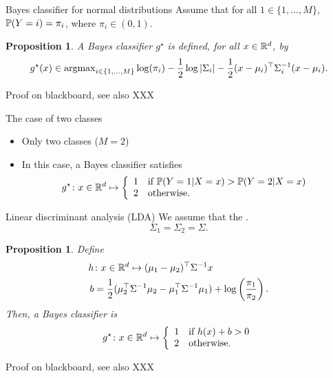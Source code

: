 \documentclass[xcolor={usenames,dvipsnames},handout]{beamer}
\newtheorem{prop}[theorem]{Proposition}
\begin{document}
\begin{frame}{Bayes classifier for normal distributions}
Assume that for all $1\in\{1,\ldots,M\}$, \alert{$\P(Y= i) = \pi_i$, where $\pi_i\in(0,1)$}.

\vspace{.2cm}

	\begin{prop}
		A Bayes classifier $g^\star$ is defined, for all $x \in \R^d$, by
		\pause
		$$
			g^\star(x) \in \argmax_{i \in \{1,\ldots,M\}} \log(\pi_i) - \frac 12 \log |\Sigma_i| - \frac 12 (x-\mu_i)^\top \Sigma_i^{-1} (x-\mu_i).
		$$
	\end{prop}

\vspace{.3cm}

\centering
{\color{Vert} Proof on blackboard, see also XXX}

\end{frame}


\begin{frame}{The case of two classes}
	\begin{itemize}
	\item  Only two classes ($M=2$) 
	\item In this case, a Bayes classifier satisfies
	$$
		g^\star \colon x \in \R^d \mapsto
		\left\{ \begin{array}{ll}
			1 & \text{if }\P (Y=1 | X=x) >\P(Y=2 | X=x) \\
			2 & \text{otherwise}.
		\end{array} \right.
	$$
	\end{itemize}
\end{frame}


\begin{frame}{Linear discriminant analysis (LDA)}
	We assume that the .
	$$
		\Sigma_1 = \Sigma_2 = \Sigma.
	$$

	
	\begin{prop}
		Define 
		\begin{align*}
			h &\colon x \in \R^d \mapsto (\mu_1-\mu_2)^\top\Sigma^{-1}x \\
			b &= \frac 12 (\mu_2^\top\Sigma^{-1}\mu_2 - \mu_1^\top\Sigma^{-1}\mu_1) + \log \left( \frac{\pi_1}{\pi_2} \right).
		\end{align*}
		Then, a Bayes classifier is
		$$
			g^\star \colon x \in \R^d \mapsto
			\left\{ \begin{array}{ll}
				1 & \text{if } h(x) + b > 0 \\
				2 & \text{otherwise}.
			\end{array} \right.
		$$
	\end{prop}

\centering
{\color{Vert} Proof on blackboard, see also XXX}

\end{frame}
\end{document}
